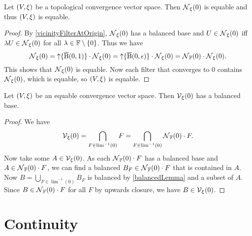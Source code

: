 \begin{lemma} \label{TVSEquable}
Let $\sSet{V,\xi}$ be a topological convergence vector space. Then $\operatorname{\mathcal{N}}_\xi(0)$ is equable and thus $\sSet{V,\xi}$ is equable.
\end{lemma}
\begin{proof}
By \ref{vicinityFilterAtOrigin}, $\operatorname{\mathcal{N}}_\xi(0)$ has a balanced base and $U\in \operatorname{\mathcal{N}}_\xi(0)$ iff $\lambda U\in \operatorname{\mathcal{N}}_\xi(0)$ for all $\lambda\in \mathbb{F}\setminus\{0\}$. Thus we have
\[ \operatorname{\mathcal{N}}_\xi(0) = \operatorname{\uparrow}\{\operatorname{\overline{B}}(0,1)\}\cdot \operatorname{\mathcal{N}}_\xi(0) = \operatorname{\uparrow}\{\operatorname{\overline{B}}(0,\epsilon)\}\cdot \operatorname{\mathcal{N}}_\xi(0) = \operatorname{\mathcal{N}}_{\mathbb{F}}(0)\cdot \operatorname{\mathcal{N}}_\xi(0). \]
This shows that $\operatorname{\mathcal{N}}_\xi(0)$ is equable. Now each filter that converges to $0$ contains $\operatorname{\mathcal{N}}_\xi(0)$, which is equable, so $\sSet{V, \xi}$ is equable.
\end{proof}

\begin{proposition} \label{equableConvergenceBalancedBase}
Let $\sSet{V,\xi}$ be an equable convergence vector space. Then $\operatorname{\mathcal{V}}_\xi(0)$ has a balanced base.
\end{proposition}
\begin{proof}
We have
\[ \operatorname{\mathcal{V}}_\xi(0) = \bigcap_{F\in \lim^{-1}(0)} F = \bigcap_{F\in \lim^{-1}(0)} \operatorname{\mathcal{N}}_{\mathbb{F}}(0)\cdot F. \]
Now take some $A\in \operatorname{\mathcal{V}}_\xi(0)$. As each $\operatorname{\mathcal{N}}_{\mathbb{F}}(0)\cdot F$ has a balanced base and $A\in\operatorname{\mathcal{N}}_{\mathbb{F}}(0)\cdot F$, we can find a balanced $B_F \in \operatorname{\mathcal{N}}_{\mathbb{F}}(0)\cdot F$ that is contained in $A$. Now $B = \bigcup_{F\in\lim^{-1}(0)}B_F$ is balanced by \ref{balancedLemma} and a subset of $A$. Since $B\in \operatorname{\mathcal{N}}_{\mathbb{F}}(0)\cdot F$ for all $F$ by upwards closure, we have $B\in \operatorname{\mathcal{V}}_\xi(0)$.
\end{proof}

\section{Continuity}

